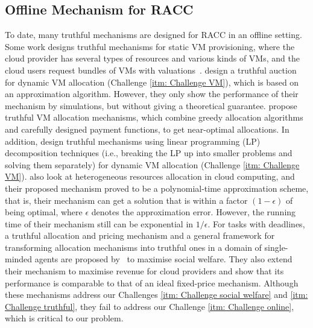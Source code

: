 \documentclass[11pt]{phdthesis}
\begin{document}
\subsection{Offline Mechanism for RACC}

To date, many truthful mechanisms are designed for RACC in an offline setting. Some work designs truthful mechanisms for static VM provisioning, where the cloud provider has several types of resources and various kinds of VMs, and the cloud users request bundles of VMs with valuations~\citep{wang2012cloud,zaman2011combinatorial,nejad2015truthful}. \citet{zaman2011combinatorial} design a truthful auction for dynamic VM allocation (Challenge \ref{itm: Challenge VM}), which is based on an approximation algorithm. However, they only show the performance of their mechanism by simulations, but without giving a theoretical guarantee. \citet{wang2012cloud,nejad2015truthful} propose truthful VM allocation mechanisms, which combine greedy allocation algorithms and carefully designed payment functions, to get near-optimal allocations. In addition, \citet{zhang2014dynamic,shi2014online} design truthful mechanisms using linear programming (LP) decomposition techniques (i.e., breaking the LP up into smaller problems and solving them separately) for dynamic VM allocation (Challenge \ref{itm: Challenge VM}). \citet{mashayekhy2015ptas} also look at heterogeneous resources allocation in cloud computing, and their proposed mechanism proved to be a polynomial-time approximation scheme, that is, their mechanism can get a solution that is within a factor $ (1-\epsilon) $ of being optimal, where $ \epsilon $ denotes the approximation error. However, the running time of their mechanism still can be exponential in $ 1/ \epsilon $. For tasks with deadlines, a truthful allocation and pricing mechanism and a general framework for transforming allocation mechanisms into truthful ones in a domain of single-minded agents are proposed by~\citet{jain2015near} to maximise social welfare. They also extend their mechanism to maximise revenue for cloud providers and show that its performance is comparable to that of an ideal fixed-price mechanism. Although these mechanisms address our Challenges \ref{itm: Challenge social welfare} and \ref{itm: Challenge truthful}, they fail to address our Challenge \ref{itm: Challenge online}, which is critical to our problem.
\end{document}
